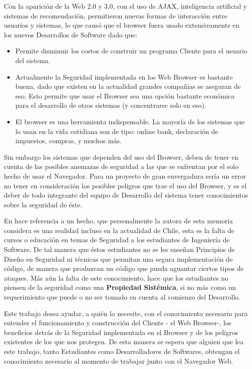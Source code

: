 Con la aparición de la Web 2.0 y 3.0, con el uso de AJAX, inteligencia artificial y sistemas de recomendación, permitieron nuevas formas de interacción entre usuarios y sistemas, lo que causó que el browser fuera usado extensivamente en los nuevos Desarrollos de Software dado que:
\begin{itemize}
	\item Permite disminuir los costos de construir un programa Cliente para el usuario del sistema.
	\item Actualmente la Seguridad implementada en los Web Browser es bastante buena, dado que existen en la actualidad grandes compañias se aseguran de eso. Esto permite que usar el Browser sea una opción bastante económica para el desarrollo de otros sistemas (y concentrarse solo en eso).
	\item El browser es una herramienta indispensable. La mayoría de los sistemas que lo usan en la vida cotidiana son de tipo: online bank, declaración de impuestos, compras, y muchos más.
\end{itemize}

Sin embargo los sistemas que dependen del uso del Browser, deben de tener en cuenta de las posibles anemazas de seguridad a las que se enfrentan por el solo hecho de usar el Navegador.  Para un proyecto de gran envergadura sería un error no tener en consideración los posibles peligros que trae el uso del Browser, y es el deber de todo integrante del equipo de Desarrollo del sistema tener conocimientos sobre la seguridad de éste.

En \cite{goertzel2007software} hace referencia a un hecho, que personalmente la autora de esta memoria considera es una realidad incluso en la actualidad de Chile, esta es la falta de cursos o educación en temas de Seguridad a los estudiantes de Ingeniería de Software. De tal manera que éstos estudiantes no se les enseñan Principios de Diseño en Seguridad ni técnicas que permitan una segura implementación de código, de manera que produzcan un código que pueda aguantar ciertos tipos de ataques. Más aún la falta de este conocimiento, hace que los estudiantes no piensen de la seguridad como una \textbf{Propiedad Sistémica}, si no más como un requerimiento que puede o no ser tomado en cuenta al comienzo del Desarrollo.

Este trabajo desea ayudar, a quién lo necesite, con el conocimiento necesario para entender el funcionamiento y construcción del Cliente - el Web Browser-, los beneficios detrás de la Seguridad implementada en el Browser y de los peligros existentes de los que nos protegen. De esta manera se espera que alguien que lea este trabajo, tanto Estudiantes como Desarrolladores de Softwares, obtengan el conocimiento necesario al momento de trabajar junto con el Navegador Web. 



